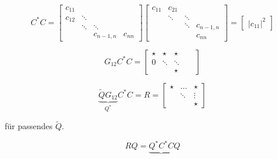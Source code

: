 \documentclass{book}
\begin{document}
            \begin{equation*}
                C^*C=\begin{bmatrix}
                    c_{11} & & & \\
                    c_{12} & \ddots & & \\
                    &  \ddots & \ddots & \\
                    & & c_{n-1,n} & c_{nn}
                \end{bmatrix}
                \begin{bmatrix}
                    c_{11} & c_{21} & & \\
                     & \ddots &\ddots & \\
                    &  & \ddots & c_{n-1,n} \\
                    & &  & c_{nn}
                \end{bmatrix}=\begin{bmatrix}
                    \vert c_{11}\vert^2 %
                \end{bmatrix}
            \end{equation*}

            \begin{equation*}
                G_{12}C^* C = \begin{bmatrix}
                    \star & \star & \star & &\\
                    0 & \ddots & \ddots  & & \\
                    &&\star %
                \end{bmatrix}
            \end{equation*}

            \begin{equation*}
                \underbrace{\tilde{Q}G_{12}}_{Q^*}C^*C=R=\begin{bmatrix}
                    \star &  \dots &  \star\\
                    &\ddots &\vdots \\
                    &&\star
                \end{bmatrix}
            \end{equation*}

            für passendes $\tilde{Q}$.

            \begin{equation}\label{g4.9} %
                RQ=\underbrace{Q^* C^* C} Q
            \end{equation}
\end{document}
